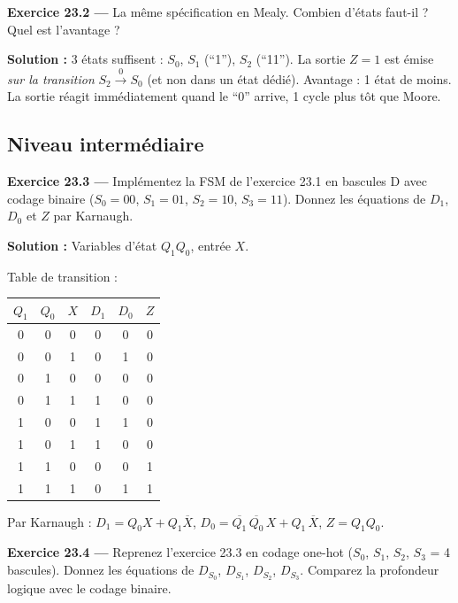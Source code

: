 \documentclass[12pt,a4paper,twoside]{book}
\begin{document}
\textbf{Exercice 23.2 ---} La même spécification en Mealy. Combien d'états faut-il ? Quel est l'avantage ?

\begin{pratique}
\textbf{Solution :} 3 états suffisent : $S_0$, $S_1$ (``1''), $S_2$ (``11''). La sortie $Z = 1$ est émise \textit{sur la transition} $S_2 \xrightarrow{0} S_0$ (et non dans un état dédié). Avantage : 1 état de moins. La sortie réagit immédiatement quand le ``0'' arrive, 1 cycle plus tôt que Moore.
\end{pratique}

\subsection*{Niveau intermédiaire}

\textbf{Exercice 23.3 ---} Implémentez la FSM de l'exercice 23.1 en bascules D avec codage binaire ($S_0 = 00$, $S_1 = 01$, $S_2 = 10$, $S_3 = 11$). Donnez les équations de $D_1$, $D_0$ et $Z$ par Karnaugh.

\begin{pratique}
\textbf{Solution :} Variables d'état $Q_1 Q_0$, entrée $X$.

Table de transition :
\begin{center}
\renewcommand{\arraystretch}{1.1}
\begin{tabular}{cc|c|cc|c}
\toprule
$Q_1$ & $Q_0$ & $X$ & $D_1$ & $D_0$ & $Z$ \\
\midrule
0 & 0 & 0 & 0 & 0 & 0 \\
0 & 0 & 1 & 0 & 1 & 0 \\
0 & 1 & 0 & 0 & 0 & 0 \\
0 & 1 & 1 & 1 & 0 & 0 \\
1 & 0 & 0 & 1 & 1 & 0 \\
1 & 0 & 1 & 1 & 0 & 0 \\
1 & 1 & 0 & 0 & 0 & 1 \\
1 & 1 & 1 & 0 & 1 & 1 \\
\bottomrule
\end{tabular}
\end{center}

Par Karnaugh : $D_1 = Q_0 X + Q_1\overline{X}$, $D_0 = \overline{Q_1}\,\overline{Q_0}\,X + Q_1\,\overline{X}$, $Z = Q_1 Q_0$.
\end{pratique}

\textbf{Exercice 23.4 ---} Reprenez l'exercice 23.3 en codage one-hot ($S_0$, $S_1$, $S_2$, $S_3$ = 4 bascules). Donnez les équations de $D_{S_0}$, $D_{S_1}$, $D_{S_2}$, $D_{S_3}$. Comparez la profondeur logique avec le codage binaire.
\end{document}
